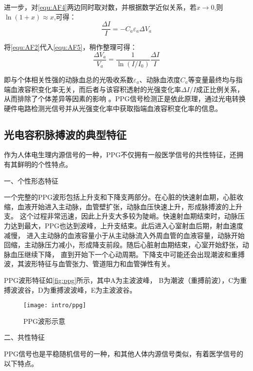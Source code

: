 进一步，对\autoref{equ:AF4}两边同时取对数，并根据数学近似关系，若$x\rightarrow 0$,则$\ln(1+x)\approx x$,可得：
\begin{equation}
    \label{equ:AF5}
    \frac{\Delta I}{I}=-C_{a}\varepsilon _{a}\Delta V_{a}
\end{equation}

将\autoref{equ:AF2}代入\autoref{equ:AF5}，稍作整理可得：
\begin{equation}
    \label{equ:AF6}
    \frac{\Delta V_{a}}{V_{a}}=\frac{1}{\ln(I/I_{0})}\frac{\Delta I}{I}
\end{equation}

即与个体相关性强的动脉血总的光吸收系数$\varepsilon _{a}$、动脉血浓度$C_{a}$等变量最终均与指端血液容积变化率无关，而后者与该容积透射的光强变化率$\Delta I/I$成正比例关系，从而排除了个体差异等因素的影响
\cite{1980Spectrophotometric,4122392,PPGYY}。PPG信号检测正是依此原理，通过光电转换硬件电路检测光信号并从光强变化率中获取指端血液容积变化率的信息。

\subsection{光电容积脉搏波的典型特征}
作为人体电生理内源信号的一种，PPG不仅拥有一般医学信号的共性特征，还拥有其鲜明的个性特点。

一、个性形态特征

一个完整的PPG波形包括上升支和下降支两部分。在心脏的快速射血期，心脏收缩，血液开始进入主动脉，血管壁扩张，动脉血压快速上升，形成脉搏波的上升支。
这个过程非常迅速，因此上升支大多较为陡峭。快速射血期结束时，动脉压力达到最大，PPG也达到波峰，上升支结束。此后进入心室射血后期，射血速度减慢，
进入主动脉的血液容量小于从主动脉流入外周血管的血液容量，动脉开始回缩，主动脉压力减小，形成降支前段。随后心脏射血期结束，心室开始舒张，动脉血压继续下降，
直到开始下一个心动周期。下降支中可能还会出现潮波和重搏波，其波形特征与血管张力、管道阻力和血管弹性有关。

PPG波形特征如\autoref{fig:ppg}所示，其中A为主波波峰，
B为潮波（重搏前波），C为重搏波波谷，D为重搏波波峰，E为主波波谷。
\begin{figure}[htbp]
    \centering
    \texttt{[image: intro/ppg]} 
    \caption{\label{fig:ppg}PPG波形示意}
\end{figure}

二、共性特征

PPG信号也是平稳随机信号的一种，和其他人体内源信号类似，有着医学信号的以下特点\cite{Ma2015,Qiu2012,Naraharisetti2011,Miao2020,LMX2019}。


